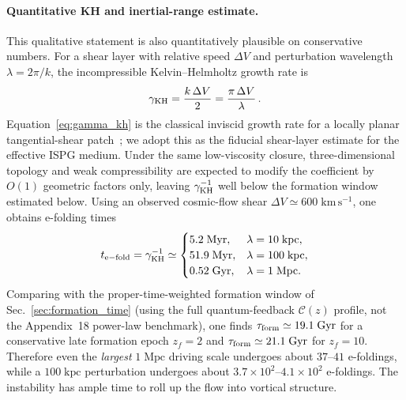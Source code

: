 \documentclass[11pt]{article}
\begin{document}
\paragraph{Quantitative KH and inertial-range estimate.}
This qualitative statement is also quantitatively plausible on
conservative numbers.  For a shear layer with relative speed $\Delta V$
and perturbation wavelength $\lambda=2\pi/k$, the incompressible
Kelvin--Helmholtz growth rate is
\begin{equation}
  \gamma_{\rm KH}=\frac{k\,\Delta V}{2}
  = \frac{\pi\,\Delta V}{\lambda}\,.
  \label{eq:gamma_kh}
\end{equation}
Equation~\eqref{eq:gamma_kh} is the classical inviscid growth rate
for a locally planar tangential-shear patch~\cite{Chandrasekhar1961};
we adopt this as the fiducial shear-layer estimate for the effective
ISPG medium.  Under the same low-viscosity closure, three-dimensional
topology and weak compressibility are expected to modify the coefficient
by $O(1)$ geometric factors only, leaving $\gamma_{\rm KH}^{-1}$ well
below the formation window estimated below.
Using an observed cosmic-flow shear
$\Delta V \simeq 600\;\mathrm{km\,s^{-1}}$, one obtains e-folding times
\begin{equation}
  t_{\rm e-fold}=\gamma_{\rm KH}^{-1}
  \simeq
  \begin{cases}
    5.2\;\mathrm{Myr}, & \lambda=10\;\mathrm{kpc},\\
    51.9\;\mathrm{Myr}, & \lambda=100\;\mathrm{kpc},\\
    0.52\;\mathrm{Gyr}, & \lambda=1\;\mathrm{Mpc}.
  \end{cases}
  \label{eq:kh_times}
\end{equation}
Comparing with the proper-time-weighted formation window of
Sec.~\ref{sec:formation_time} (using the full quantum-feedback
$\mathcal{C}(z)$ profile, not the Appendix~18 power-law benchmark),
one finds
$\tau_{\rm form}\simeq19.1\;\mathrm{Gyr}$ for a conservative late
formation epoch $z_f=2$ and
$\tau_{\rm form}\simeq21.1\;\mathrm{Gyr}$ for $z_f=10$.  Therefore even
the \emph{largest} $1\;\mathrm{Mpc}$ driving scale undergoes about
$37$--$41$ e-foldings, while a $100\;\mathrm{kpc}$ perturbation undergoes
about $3.7\times10^2$--$4.1\times10^2$ e-foldings.  The instability has
ample time to roll up the flow into vortical structure.
\end{document}
